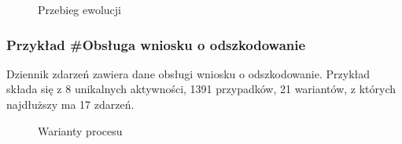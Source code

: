 \begin{figure}[H]
	\caption{\label{fig:flow_chart}Przebieg ewolucji}
\end{figure}

\subsubsection{Przykład \#Obsługa wniosku o odszkodowanie}
\label{sec:example5}
Dziennik zdarzeń zawiera dane obsługi wniosku o odszkodowanie.
Przykład składa się z 8 unikalnych aktywności, 1391 przypadków, 21 wariantów, z których najdłuższy ma 17 zdarzeń. 
\begin{figure}[!ht]
	\caption{\label{fig:flow_chart}Warianty procesu}
\end{figure}

